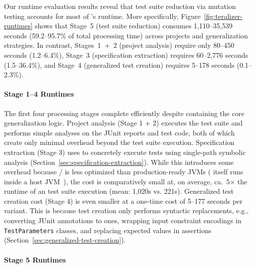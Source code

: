 Our runtime evaluation results reveal
that test suite reduction via mutation testing
accounts for most of \ToolTeralizer{}'s runtime.
More specifically, Figure~\ref{fig:teralizer-runtimes} shows
that Stage~5 (test suite reduction) consumes 1,110--35,539 seconds
(59.2--95.7\% of total processing time)
across projects and generalization strategies.
In contrast, Stages~1~+~2 (project analysis) require only 80--450 seconds (1.2--6.4\%),
Stage~3 (specification extraction) requires 60--2,776 seconds (1.5--36.4\%),
and Stage~4 (generalized test creation) requires 5--178 seconds (0.1--2.3\%).

\paragraph{Stage 1--4 Runtimes}

The first four processing stages complete efficiently
despite containing the core generalization logic.
Project analysis (Stage 1 + 2) executes the \VariantOriginal{} test suite
and performs simple analyses on the JUnit reports and test code,
both of which create only minimal overhead beyond the test suite execution.
Specification extraction (Stage 3) uses \ToolSPF{}
to concretely execute tests using single-path symbolic analysis
(Section~\ref{sec:specification-extraction}).
While this introduces some overhead
because \ToolJPF / \ToolSPF{}
is less optimized than production-ready JVMs
(\ToolJPF{} itself runs inside a host JVM~\cite{pasareanu_2013_symbolic}),
the cost is comparatively small at, on average, ca.\ 5$\times$ the runtime of an \VariantOriginal{} test suite execution (mean: 1,020s vs. 221s).
Generalized test creation cost (Stage 4) is even smaller at a one-time cost
of 5--177 seconds per variant.
This is because test creation
only performs syntactic replacements, e.g.,
converting JUnit annotations to \ToolJqwik{} ones,
wrapping input constraint encodings in \texttt{TestParameters} classes,
and replacing expected values in assertions
(Section~\ref{sec:generalized-test-creation}).

\paragraph{Stage 5 Runtimes}

